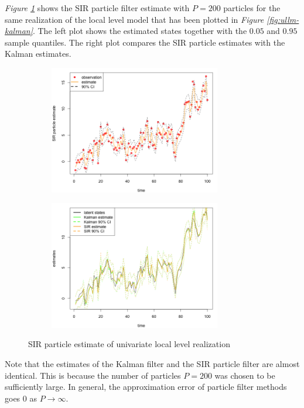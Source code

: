\documentclass[11pt, oneside]{scrreprt}   	%
\begin{document}
\textit{Figure \ref{fig:ullm-particle}} shows the SIR particle filter estimate with $P=200$ particles for the same realization of the local level model that has been plotted in \textit{Figure \ref{fig:ullm-kalman}}. The left plot shows the estimated states together with the $0.05$ and $0.95$ sample quantiles. The right plot compares the SIR particle estimates with the Kalman estimates. 
\begin{figure}[h!]
\centering
\begin{subfigure}{.5\textwidth}
  \centering
  \includegraphics[width=75mm]{../../images/ullm-estimate-particle.png}
\end{subfigure}%
\begin{subfigure}{.5\textwidth}
  \centering
  \includegraphics[width=75mm]{../../images/ullm-filter-comparison.png}
\end{subfigure}
\caption{SIR particle estimate of univariate local level realization}
\label{fig:ullm-particle}
\end{figure}
Note that the estimates of the Kalman filter and the SIR particle filter are almost identical. 
This is because the number of particles $P=200$ was chosen to be sufficiently large. 
In general, the approximation error of particle filter methods goes $0$ as $P \to \infty$.

\end{document}
